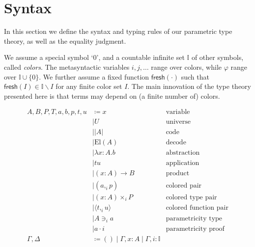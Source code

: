 \documentclass[english]{PaperTools/latex/lipics}
\newcommand\CP[3]{(#2,_{#1} #3)}
\newcommand\CTimes[2]{(#2) ×_{#1}}
\newcommand\param[1]{\!\cdot\!#1}
\newcommand\op[1]{∋_{#1}}
\newcommand\fp[3]{⟨#2 ,_{#1} #3⟩}
\def\fresh#1{\mathsf{fresh}(#1)}
\def\El#1{\mathrm{El}(#1)}
\begin{document}
\section{Syntax}
\label{sec:syntax}
In this section we define the syntax and typing rules of our
parametric type theory, as well as the equality judgment.

We assume a special symbol ‘0’, and a countable infinite set $𝕀$ of
other symbols, called \emph{colors}.
The metasyntactic variables $i,j,\ldots$ range over colors,
while $φ$ range over $𝕀 ∪ \{0\}$.
We further assume a fixed function $\fresh{·}$ such that
$\fresh{I} ∈ 𝕀 \backslash I$ for any finite color set $I$.
%
The main innovation of the type theory
presented here is that terms may depend on (a finite number of)
colors.
\begin{definition}
  \begin{align*}
    A,B,P,T,a,b,p,t,u &
              \coloneqq x & \text {variable} \\
            & \mid U & \text{universe} \\ 
            & \mid |A| & \text{code} \\ 
            & \mid \El{A} & \text{decode} \\
            & \mid λx:A. b & \text{abstraction} \\
            & \mid t u & \text{application} \\ 
            & \mid (x:A) → B & \text{product} \\
            & \mid \CP i a p & \text{colored pair} \\
            & \mid \CTimes i {x:A} P & \text{colored type pair} \\
            & \mid \fp i t u & \text{colored function pair}\\
            & \mid A \op i a & \text{parametricity type} \\
            & \mid a \param i & \text{parametricity proof} \\
    \Gamma,\Delta & \coloneqq () \mid \Gamma,x:A \mid \Gamma,i:𝕀
  \end{align*}
\end{definition}
\end{document}
